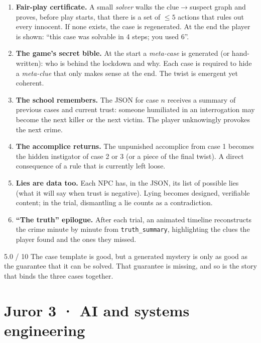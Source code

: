 \documentclass[11pt,a4paper]{article}
\begin{document}
\begin{inedito}
\begin{enumerate}
\item \textbf{Fair-play certificate.} A small \emph{solver} walks the clue$\to$suspect graph and
proves, before play starts, that there is a set of $\leq 5$ actions that rules out every innocent.
If none exists, the case is regenerated. At the end the player is shown: ``this case was solvable in
4 steps; you used 6''.
\item \textbf{The game's secret bible.} At the start a \emph{meta-case} is generated (or hand-written):
who is behind the lockdown and why. Each case is required to hide a \emph{meta-clue} that only makes
sense at the end. The twist is emergent yet coherent.
\item \textbf{The school remembers.} The JSON for case $n$ receives a summary of previous cases and
current trust: someone humiliated in an interrogation may become the next killer or the next victim.
The player unknowingly provokes the next crime.
\item \textbf{The accomplice returns.} The unpunished accomplice from case 1 becomes the hidden
instigator of case 2 or 3 (or a piece of the final twist). A direct consequence of a rule that is
currently left loose.
\item \textbf{Lies are data too.} Each NPC has, in the JSON, its list of possible lies (what it will
say when trust is negative). Lying becomes designed, verifiable content; in the trial, dismantling a
lie counts as a contradiction.
\item \textbf{``The truth'' epilogue.} After each trial, an animated timeline reconstructs the crime
minute by minute from \texttt{truth\_summary}, highlighting the clues the player found and the ones
they missed.
\end{enumerate}
\end{inedito}

\begin{veredicto}{5.0 / 10}
The case template is good, but a generated mystery is only as good as the guarantee that it can be
solved. That guarantee is missing, and so is the story that binds the three cases together.
\end{veredicto}

\section{Juror 3 · AI and systems engineering}
\end{document}
